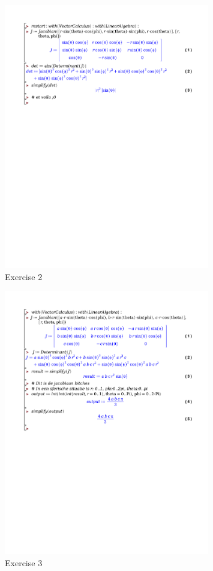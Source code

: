 \documentclass[a4paper]{article}
\begin{document}
\begin{figure}[H]
	\centering
	\includegraphics[width=0.8\textwidth]{exercises/huis_5_ex_2.pdf}
	\caption{Exercise 2}
	\label{fig:huis_5_ex_2}
\end{figure}

\begin{figure}[H]
	\centering
	\includegraphics[width=0.8\textwidth]{exercises/huis_5_ex_3.pdf}
	\caption{Exercise 3}
	\label{fig:huis_5_ex_3}
\end{figure}
\end{document}
